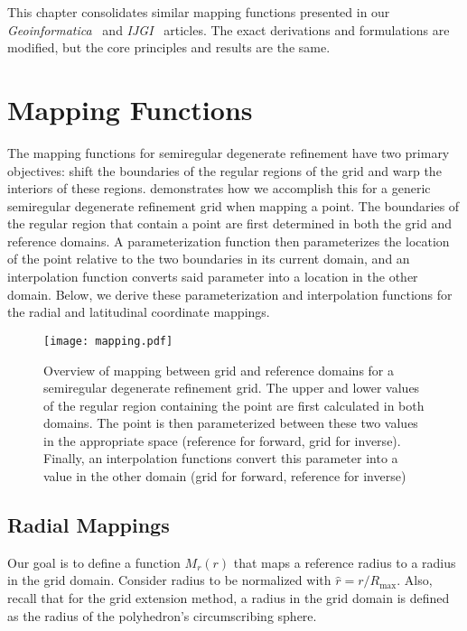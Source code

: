 This chapter consolidates similar mapping functions presented in our \textit{Geoinformatica}~\cite{ulmer2020toward} and \textit{IJGI}~\cite{ulmer2020general} articles.
The exact derivations and formulations are modified, but the core principles and results are the same.


\section{Mapping Functions} \label{chap:6:functions}
The mapping functions for semiregular degenerate refinement have two primary objectives: shift the boundaries of the regular regions of the grid and warp the interiors of these regions.
 demonstrates how we accomplish this for a generic semiregular degenerate refinement grid when mapping a point.
The boundaries of the regular region that contain a point are first determined in both the grid and reference domains.
A parameterization function then parameterizes the location of the point relative to the two boundaries in its current domain, and an interpolation function converts said parameter into a location in the other domain.
Below, we derive these parameterization and interpolation functions for the radial and latitudinal coordinate mappings.


\begin{figure}[ht!]
	\centering
	\texttt{[image: mapping.pdf]}
	\caption[Overview of mapping for semiregular degenerate refinement grids]{
		Overview of mapping between grid and reference domains for a semiregular degenerate refinement grid.
		The upper and lower values of the regular region containing the point are first calculated in both domains.
		The point is then parameterized between these two values in the appropriate space (reference for forward, grid for inverse).
		Finally, an interpolation functions convert this parameter into a value in the other domain (grid for forward, reference for inverse)
	}
	\label{fig:mapping}
\end{figure}


\subsection{Radial Mappings} \label{chap:6:radial}
Our goal is to define a function $M_r(r)$ that maps a reference radius to a radius in the grid domain.
Consider radius to be normalized with $\hat{r} = r / R_\mathrm{max}$.
Also, recall that for the grid extension method, a radius in the grid domain is defined as the radius of the polyhedron's circumscribing sphere.


